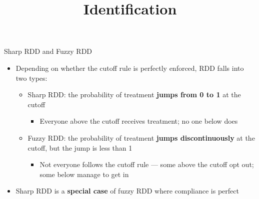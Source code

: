 \documentclass[hyperref={pdfpagelabels=false}]{beamer}
\begin{document}
\title[]
{Identification}

\author{}
\institute{}
\date{}

\begin{frame}{}
    \titlepage
\end{frame}


\begin{frame}{Sharp RDD and Fuzzy RDD}{}

\begin{itemize}
    \item Depending on whether the cutoff rule is perfectly enforced, RDD
          falls into two types:
    \vspace{0.25cm}
    \begin{itemize}
        \item[1] {\color{blue}Sharp RDD}: the probability of treatment
              \textbf{jumps from 0 to 1} at the cutoff
        \vspace{0.1cm}
        \begin{itemize}
            \item Everyone above the cutoff receives treatment;
                  no one below does
        \end{itemize}
        \vspace{0.2cm}
        \item[2] {\color{blue}Fuzzy RDD}: the probability of treatment
              \textbf{jumps discontinuously} at the cutoff,
              but the jump is less than 1
        \vspace{0.1cm}
        \begin{itemize}
            \item Not everyone follows the cutoff rule ---
                  some above the cutoff opt out;
                  some below manage to get in
        \end{itemize}
    \end{itemize}
    \vspace{0.2cm}
    \item Sharp RDD is a \textbf{special case} of fuzzy RDD
          where compliance is perfect
\end{itemize}
\end{frame}
\end{document}
